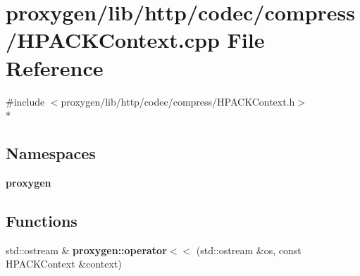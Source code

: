 \section{proxygen/lib/http/codec/compress/\+H\+P\+A\+C\+K\+Context.cpp File Reference}
\label{HPACKContext_8cpp}
{\ttfamily \#include $<$proxygen/lib/http/codec/compress/\+H\+P\+A\+C\+K\+Context.\+h$>$}\\*
\subsection*{Namespaces}
\begin{DoxyCompactItemize}
\item 
 {\bf proxygen}
\end{DoxyCompactItemize}
\subsection*{Functions}
\begin{DoxyCompactItemize}
\item 
std\+::ostream \& {\bf proxygen\+::operator$<$$<$} (std\+::ostream \&os, const H\+P\+A\+C\+K\+Context \&context)
\end{DoxyCompactItemize}
